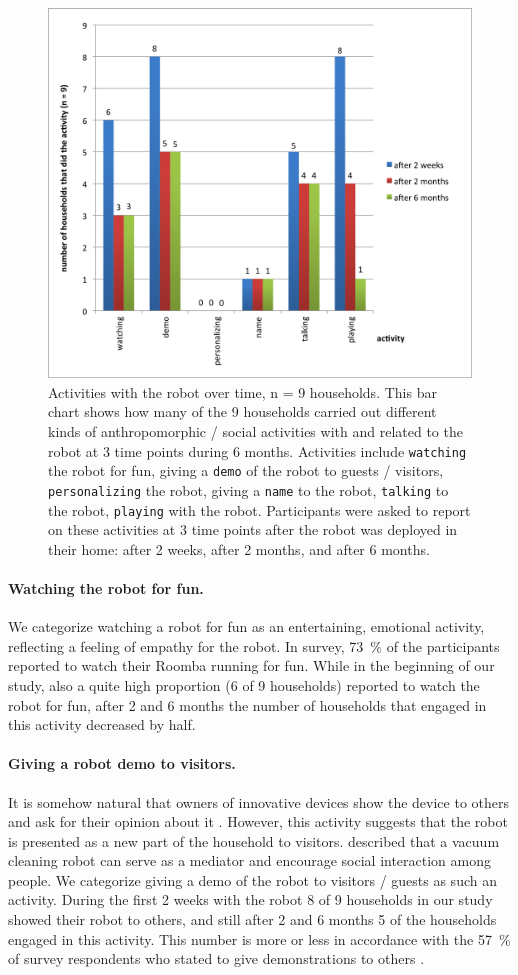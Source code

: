\documentclass{frontiersSCNS} %
\begin{document}
\begin{figure}
    \centering
    \includegraphics[width=0.5\columnwidth]{roomba-activities.png}
    \caption{Activities with the robot over time, n = 9 households. This bar
        chart shows how many of the 9 households carried out different kinds of
        anthropomorphic / social activities with and related to the robot at 3
        time points during 6 months. Activities include \texttt{watching} the
        robot for fun, giving a \texttt{demo} of the robot to guests / visitors,
        \texttt{personalizing} the robot, giving a \texttt{name} to the robot,
        \texttt{talking} to the robot, \texttt{playing} with the robot.
        Participants were asked to report on these activities at 3 time points
        after the robot was deployed in their home: after 2 weeks, after 2 months,
        and after 6 months.} 

\label{fig:roomba-activities}
\end{figure}

\paragraph*{Watching the robot for fun.} We categorize watching a robot for fun
as an entertaining, emotional activity, reflecting a feeling of empathy for the
robot. In \cite{sung_housewives_2008} survey, 73~\% of the participants reported
to watch their Roomba running for fun. While in the beginning of our study, also
a quite high proportion (6 of 9 households) reported to watch the robot for fun,
after 2 and 6 months the number of households that engaged in this activity
decreased by half. 

\paragraph*{Giving a robot demo to visitors.} It is somehow natural that owners
of innovative devices show the device to others and ask for their opinion about
it \citep{rogers_diffusion_1995}. However, this activity suggests that the robot
is presented as a new part of the household to visitors.
\cite{sung_domestic_2010} described that a vacuum cleaning robot can serve as a
mediator and encourage social interaction among people. We categorize giving a
demo of the robot to visitors / guests as such an activity. During the first 2
weeks with the robot 8 of 9 households in our study showed their robot to
others, and still after 2 and 6 months 5 of the households engaged in this
activity. This number is more or less in accordance with the 57~\% of survey
respondents who stated to give demonstrations to others
\citep{sung_housewives_2008}.
\end{document}
